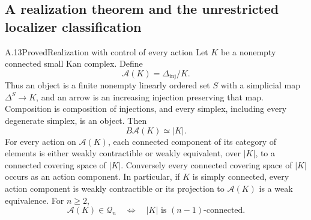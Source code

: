 \subsection{A realization theorem and the unrestricted localizer classification}

\begin{claim}{A.13}{Proved}{Realization with control of every action}\label{A:general-realization}
Let $K$ be a nonempty connected small Kan complex. Define
\[
 \mathcal A(K)=\Delta_{\mathrm{inj}}/K.
\]
Thus an object is a finite nonempty linearly ordered set $S$ with a simplicial map $\Delta^S\to K$, and an arrow is an increasing injection preserving that map. Composition is composition of injections, and every simplex, including every degenerate simplex, is an object. Then
\[
 B\mathcal A(K)\simeq |K|.
\]
For every action on $\mathcal A(K)$, each connected component of its category of elements is either weakly contractible or weakly equivalent, over $|K|$, to a connected covering space of $|K|$. Conversely every connected covering space of $|K|$ occurs as an action component. In particular, if $K$ is simply connected, every action component is weakly contractible or its projection to $\mathcal A(K)$ is a weak equivalence. For $n\geq2$,
\[
 \mathcal A(K)\in\mathcal Q_n
 \quad\Longleftrightarrow\quad
 |K|\text{ is }(n-1)\text{-connected}.
\]
\end{claim}
